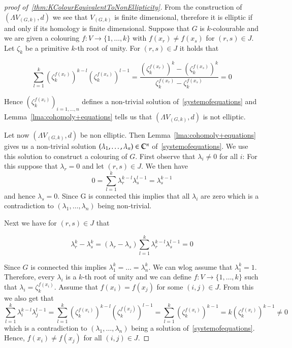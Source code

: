  
 \begin{proof}[proof of~\ref{thm:KColourEquivalentToNonEllipticity}]
  From the construction of $(\Lambda V_{(G,k)},d)$ we see that  $V_{(G,k)}$ is finite dimensional, therefore
  it is elliptic if and only if its homology is finite dimensional. Suppose that $G$ is $k$-colourable and we are given a colouring
  $f \colon V \to { \lbrace 1, \dotsc , k \rbrace }$ with $f(x_r) \neq f(x_s)$ for $(r,s) \in J$. Let $\zeta_k$ be a primitive 
  $k$-th root of unity. For $(r,s) \in J$ it holds that
  
  $$ \sum_{l = 1}^k (\zeta_k^{f(x_r)})^{k-l} (\zeta_k^{f(x_s)})^{l-1}
  = \frac{(\zeta_k^{f(x_r)})^{k} - (\zeta_k^{f(x_s)})^{k}}{ \zeta_k^{f(x_r)} - \zeta_k^{f(x_s)}} = 0
  $$
  
  Hence $(\zeta_k^{f(x_i)})_{i = 1, \dotsc, n}$ defines a non-trivial solution of~\ref{systemofequations}
  and Lemma~\ref{lma:cohomoly+equations} tells us that $(\Lambda V_{(G,k)},d)$ is not elliptic. 
  
  Let now $(\Lambda V_{(G,k)},d)$ be non elliptic. Then Lemma~\ref{lma:cohomoly+equations} gives us a non-trivial
  solution $(\lambda_1 , \dotsc, \lambda_n) \in \mathbb{C}^n$ of~\ref{systemofequations}. We use this solution to construct
  a colouring of $G$. 
  First observe that $\lambda_i \neq 0$ for all $i$: For this suppose that $\lambda_r = 0$ and let $(r,s) \in J$.
  We then have 
  $$0 =\sum_{l = 1}^k \lambda_r^{k -l} \lambda_s^{l - 1} = \lambda_s^{k-1}$$
  and hence $\lambda_s = 0$. Since G is connected this implies that all $\lambda_i$ are zero which is a
  contradiction to $(\lambda_1, \ldots, \lambda_n)$ being non-trivial.
  
  Next we have
  for $(r,s) \in J$ that
  
  $$ \lambda_r^k - \lambda_s^k = ( \lambda_r - \lambda_s) 
  \sum_{l = 1}^k \lambda_r^{k - l} \lambda_s^{l - 1} = 0$$
  
  Since $G$ is connected this implies
  $\lambda_1^k = \dotsc = \lambda_n^k$.  We can wlog assume that  $\lambda_1^k = 1$. Therefore, every $\lambda_i$ is a 
  $k$-th root of unity and we can define $f \colon V \to { \lbrace 1, \dotsc , k \rbrace }$ such that 
  $\lambda_i = \zeta_k^{f(x_i)}$.
  Assume that $f(x_i) = f(x_j)$ for some $(i,j) \in J$.
  From this we also get that 
  $$\sum_{l = 1}^k \lambda_i^{k - l} \lambda_j^{l - 1} = \sum_{l = 1}^k (\zeta_k^{f(x_i)})^{k-l} (\zeta_k^{f(x_j)})^{l-1}
  = \sum_{l = 1}^k (\zeta_k^{f(x_i)})^{k-1} = k (\zeta_k^{f(x_i)})^{k-1} \neq 0$$ 
  which is a contradiction to $(\lambda_1 , \dotsc, \lambda_n)$ being a solution of~\ref{systemofequations}. Hence,
  $f(x_i) \neq f(x_j)$ for all $(i,j) \in J$.
  
 \end{proof}

